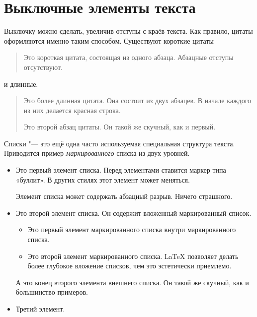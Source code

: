 \documentclass[final,pdftex]{epsilonj}
\numberwithin{equation}{section}
\begin{document}
\section{Выключные элементы текста}

Выключку можно сделать, увеличив отступы с краёв текста. Как правило, цитаты оформляются именно таким способом.
Существуют короткие цитаты 
\begin{quote}
   Это короткая цитата, состоящая из одного абзаца. Абзацные отступы отсутствуют. 
\end{quote}
и длинные.
\begin{quotation}
   Это более длинная цитата. Она состоит из двух абзацев. В начале каждого из них делается красная строка.

   Это второй абзац цитаты. Он такой же скучный, как и первый.
\end{quotation}

Списки "--- это ещё одна часто используемая специальная структура текста.
Приводится пример \emph{маркированного} списка из двух уровней.
\begin{itemize}
\item Это первый элемент списка. Перед элементами ставится маркер типа «буллит». В других стилях этот элемент может меняться.

Элемент списка может содержать абзацный разрыв. Ничего страшного.
\item  Это второй элемент списка. Он содержит вложенный маркированный список. 
    \begin{itemize}
       \item Это первый элемент маркированного списка внутри маркированного списка. 
          \item Это второй элемент маркированного списка.  \LaTeX{} позволяет делать более глубокое вложение списков, чем это эстетически приемлемо.
      \end{itemize}
      А это конец второго элемента внешнего списка. Он такой же скучный, как и большинство примеров. 
   \item  Третий элемент.
\end{itemize}
\end{document}
